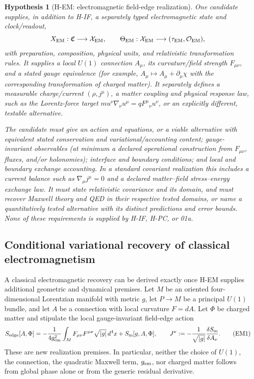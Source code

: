 \documentclass[11pt,a4paper]{article}
\newtheorem{hypothesis}[definition]{Hypothesis}
\theoremstyle{remark}
\newcommand{\Cont}{\mathfrak C}
\newcommand{\State}{\mathcal X}
\begin{document}
\begin{hypothesis}[H-EM: electromagnetic field-edge realization]\label{hyp:em}
One candidate supplies, in addition to H-IF, a separately typed electromagnetic
state and clock/readout,
\[
 X_{\rm EM}:\Cont\longrightarrow\State_{\rm EM},\qquad
 \Theta_{\rm EM}:\State_{\rm EM}\longrightarrow
 (\tau_{\rm EM},\mathcal O_{\rm EM}),
\]
with preparation, composition, physical units, and relativistic transformation
rules. It supplies a local $U(1)$ connection $A_\mu$, its curvature/field
strength $F_{\mu\nu}$, and a stated gauge equivalence (for example,
$A_\mu\mapsto A_\mu+\partial_\mu\chi$ with the corresponding transformation of
charged matter). It separately defines a measurable charge/current
$(\rho,j^\mu)$, a matter coupling and physical response law, such as the
Lorentz-force target $m u^\nu\nabla_\nu u^\mu=qF^\mu{}_{\nu}u^\nu$, or an
explicitly different, testable alternative.

The candidate must give an action and equations, or a viable alternative with
equivalent stated conservation and variational/accounting content; gauge-
invariant observables (at minimum a declared operational construction from
$F_{\mu\nu}$, fluxes, and/or holonomies); interface and boundary conditions;
and local and boundary exchange accounting. In a standard covariant realization
this includes a current balance such as $\nabla_\mu j^\mu=0$ and a declared
matter--field stress--energy exchange law. It must state relativistic covariance
and its domain, and must recover Maxwell theory and QED in their respective
tested domains, or name a quantitatively tested alternative with its distinct
predictions and error bounds. None of these requirements is supplied by
H-IF, H-PC, or 01a.
\end{hypothesis}

\subsection{Conditional variational recovery of classical electromagnetism}
A classical electromagnetic recovery can be derived exactly once H-EM supplies
additional geometric and dynamical premises. Let $M$ be an oriented
four-dimensional Lorentzian manifold with metric $g$, let $P\to M$ be a
principal $U(1)$ bundle, and let $A$ be a connection with local curvature
$F=dA$. Let $\Phi$ be charged matter and stipulate the local gauge-invariant
field-edge action
\[
 S_{\rm edge}[A,\Phi]=-
 \frac{1}{4g_{\rm em}^{2}}\int_M F_{\mu\nu}F^{\mu\nu}\sqrt{|g|}\,d^4x
 +S_{\rm m}[g,A,\Phi],\qquad
 J^\nu:=-\frac{1}{\sqrt{|g|}}\frac{\delta S_{\rm m}}{\delta A_\nu}.
 \tag{EM1}
\]
These are new realization premises. In particular, neither the choice of
$U(1)$, the connection, the quadratic Maxwell term, $g_{\rm em}$, nor charged
matter follows from global phase alone or from the generic residual derivative.
\end{document}
